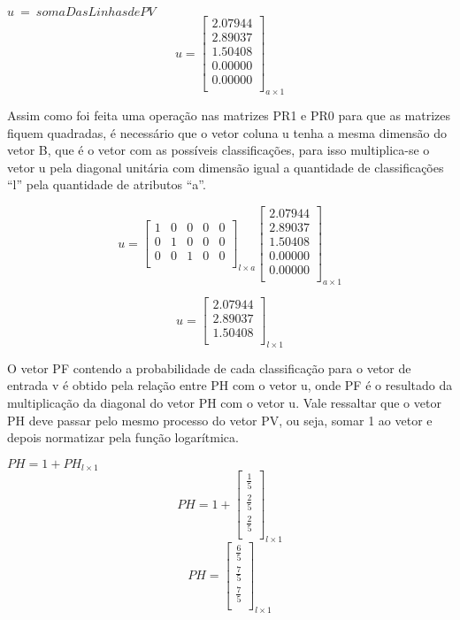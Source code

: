 \begin{anexosenv}
\begin{center}
$u \ = \ soma Das Linhas de PV$
$$u=\left[
\begin{array}{c}
2.07944 \\
2.89037 \\
1.50408 \\
0.00000 \\
0.00000 \\
\end{array}
\right]_{a \times 1}$$
\end{center}

Assim como foi feita uma operação nas matrizes PR1 e PR0 para que as
matrizes fiquem quadradas, é necessário que o vetor coluna u tenha a mesma
dimensão do vetor B, que é o vetor com as possíveis classificações, para
isso multiplica-se o vetor u pela diagonal unitária com dimensão
igual a quantidade de classificações ``l'' pela quantidade de atributos ``a''.

$$u=\left[
\begin{array}{ccccc}
1 & 0 & 0 & 0 & 0 \\
0 & 1 & 0 & 0 & 0 \\
0 & 0 & 1 & 0 & 0 \\
\end{array}
\right]_{l \times a}
\left[
\begin{array}{c}
2.07944 \\
2.89037 \\
1.50408 \\
0.00000 \\
0.00000 \\
\end{array}
\right]_{a \times 1}
$$

$$u=\left[
\begin{array}{c}
2.07944 \\
2.89037 \\
1.50408 \\
\end{array}
\right]_{l \times 1}
$$

O vetor PF contendo a probabilidade de cada classificação para o vetor de
entrada v é obtido pela relação entre PH com o vetor u, onde PF é o resultado da multiplicação da
diagonal do vetor PH com o vetor u. Vale ressaltar que o vetor PH deve passar pelo
mesmo processo do vetor PV, ou seja, somar 1 ao vetor e depois normatizar pela
função logarítmica.

\begin{center}
$PH = 1 + PH_{l \times 1}$
$$PH=1 + \left[
\begin{array}{c}
\frac{1}{5} \\
\frac{2}{5} \\
\frac{2}{5} \\
\end{array}
\right]_{l \times 1}$$
$$PH=\left[
\begin{array}{c}
\frac{6}{5} \\
\frac{7}{5} \\
\frac{7}{5} \\
\end{array}
\right]_{l \times 1}$$
\end{center}


\end{anexosenv}
